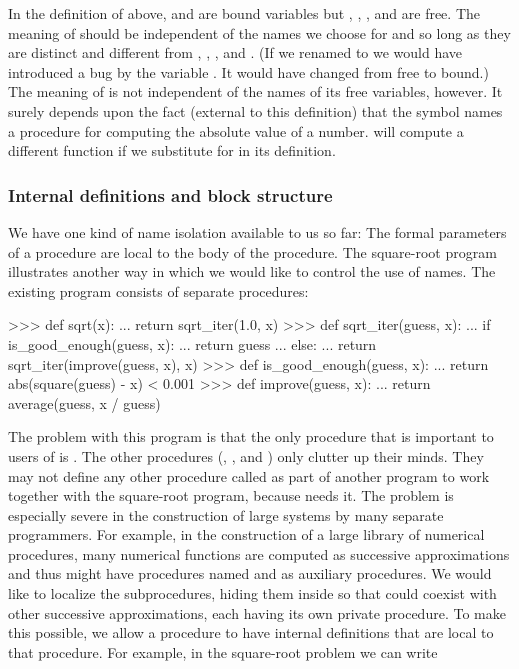 In the definition of  above,  and 
are bound variables but \code{<}, \code{-}, , and  are
free. The meaning of  should be independent of the names
we choose for  and  so long as they are distinct and
different from \code{<}, \code{-}, , and .  (If we
renamed  to  we would have introduced a bug by
 the variable .  It would have changed from free to
bound.)  The meaning of  is not independent of the names
of its free variables, however.  It surely depends upon the fact (external to
this definition) that the symbol  names a procedure for computing the
absolute value of a number.   will compute a different
function if we substitute  for  in its definition.

\subsubsection*{Internal definitions and block structure}

We have one kind of name isolation available to us so far: The formal parameters
of a procedure are local to the body of the procedure.  The square-root program
illustrates another way in which we would like to control the use of names.  The
existing program consists of separate procedures:

\begin{codeBlock}
>>> def sqrt(x):
...     return sqrt_iter(1.0, x)
>>> def sqrt_iter(guess, x):
...     if is_good_enough(guess, x):
...         return guess
...     else:
...         return sqrt_iter(improve(guess, x), x)
>>> def is_good_enough(guess, x):
...     return abs(square(guess) - x) < 0.001
>>> def improve(guess, x):
...     return average(guess, x / guess)
\end{codeBlock}

\noindent
The problem with this program is that the only procedure that is important to
users of  is .  The other procedures (,
, and ) only clutter up their minds.  They
may not define any other procedure called  as part of
another program to work together with the square-root program, because
 needs it.  The problem is especially severe in the construction of
large systems by many separate programmers.  For example, in the construction of
a large library of numerical procedures, many numerical functions are computed
as successive approximations and thus might have procedures named
 and  as auxiliary procedures.  We would
like to localize the subprocedures, hiding them inside  so that
 could coexist with other successive approximations, each having its
own private  procedure.  To make this possible, we allow
a procedure to have internal definitions that are local to that procedure.  For
example, in the square-root problem we can write

